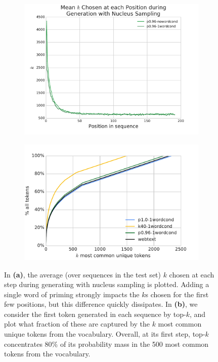 \begin{figure}[t]
    \begin{subfigure}{.45\textwidth}
        \center
        \includegraphics[width=\textwidth]{figures/mean_ks}
        \caption{}
        \label{fig:mean_ks} 
    \end{subfigure}
    \begin{subfigure}{.45\textwidth}
        \center
        \includegraphics[width=\textwidth]{figures/token_count_histogram}
        \caption{}
        \label{fig:token_count_histogram} 
    \end{subfigure}
    \caption{In \textbf{(a)}, the average (over sequences in the test set) $k$ chosen at each step during generating with nucleus sampling is plotted. Adding a single word of priming strongly impacts the $k$s chosen for the first few positions, but this difference quickly dissipates.
    In \textbf{(b)}, we consider the first token generated in each sequence by top-$k$, and plot what fraction of these are captured by the $k$ most common unique tokens from the vocabulary. Overall, at its first step, top-$k$ concentrates 80\% of its probability mass in the 500 most common tokens from the vocabulary.}
\end{figure}

